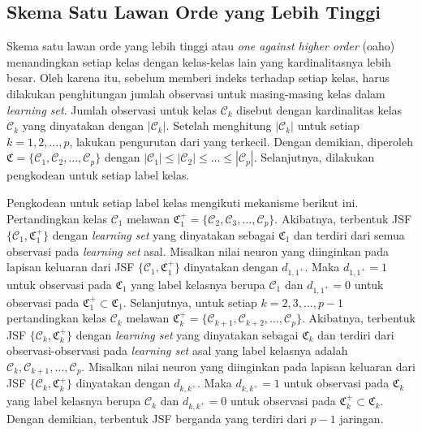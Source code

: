 \subsection{Skema Satu Lawan Orde yang Lebih Tinggi}
\noindent Skema satu lawan orde yang lebih tinggi atau \emph{one against higher order} (\gls{oaho}) menandingkan setiap kelas dengan kelas-kelas lain yang kardinalitasnya lebih besar. Oleh karena itu, sebelum memberi indeks terhadap setiap kelas, harus dilakukan penghitungan jumlah observasi untuk masing-masing kelas dalam \emph{learning set}. Jumlah observasi untuk kelas $\mathcal{C}_k$ disebut dengan kardinalitas kelas $\mathcal{C}_k$ yang dinyatakan dengan $|\mathcal{C}_k|$. Setelah menghitung $|\mathcal{C}_k|$ untuk setiap $k=1,2,\ldots,p$, lakukan pengurutan dari yang terkecil. Dengan demikian, diperoleh $\mathfrak{C}=\{\mathcal{C}_1, \mathcal{C}_2, \ldots, \mathcal{C}_p\}$ dengan $|\mathcal{C}_1| \leq |\mathcal{C}_2| \leq \ldots \leq |\mathcal{C}_p|$. Selanjutnya, dilakukan pengkodean untuk setiap label kelas.

\noindent Pengkodean untuk setiap label kelas mengikuti mekanisme berikut ini. Pertandingkan kelas $\mathcal{C}_1$ melawan $\mathfrak{C}^+_1 = \{\mathcal{C}_2, \mathcal{C}_3, \ldots, \mathcal{C}_p \}$. Akibatnya, terbentuk JSF $\{\mathcal{C}_1,\mathfrak{C}^+_1\}$ dengan \emph{learning set} yang dinyatakan sebagai $\mathfrak{C}_1$ dan terdiri dari semua observasi pada \emph{learning set} asal. Misalkan nilai neuron yang diinginkan pada lapisan keluaran dari JSF $\{\mathcal{C}_1,\mathfrak{C}^+_1\}$ dinyatakan dengan $d_{1,1^+}$. Maka $d_{1,1^+} = 1$ untuk observasi pada $\mathfrak{C}_1$ yang label kelasnya berupa $\mathcal{C}_1$ dan  $d_{1,1^+} = 0$ untuk observasi pada $\mathfrak{C}^+_1 \subset \mathfrak{C}_1$. Selanjutnya, untuk setiap $k=2,3,\ldots,p-1$ pertandingkan kelas $\mathcal{C}_k$ melawan $\mathfrak{C}^+_k = \{\mathcal{C}_{k+1}, \mathcal{C}_{k+2}, \ldots, \mathcal{C}_p \}$. Akibatnya, terbentuk JSF $\{\mathcal{C}_k,\mathfrak{C}^+_k\}$ dengan \emph{learning set} yang dinyatakan sebagai $\mathfrak{C}_k$ dan terdiri dari observasi-observasi pada \emph{learning set} asal yang label kelasnya adalah $\mathcal{C}_k, \mathcal{C}_{k+1}, \ldots, \mathcal{C}_p$. Misalkan nilai neuron yang diinginkan pada lapisan keluaran dari JSF $\{\mathcal{C}_k,\mathfrak{C}^+_k\}$ dinyatakan dengan $d_{k,k^+}$. Maka $d_{k,k^+} = 1$ untuk observasi pada $\mathfrak{C}_k$ yang label kelasnya berupa $\mathcal{C}_k$ dan  $d_{k,k^+} = 0$ untuk observasi pada $\mathfrak{C}^+_k \subset \mathfrak{C}_k$. Dengan demikian, terbentuk JSF berganda yang terdiri dari $p-1$ jaringan.

